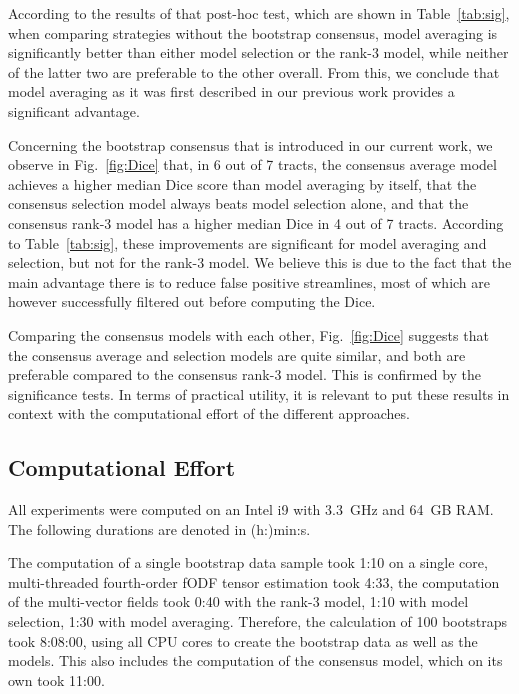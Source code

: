 According to the results of that post-hoc test, which are shown in Table~\ref{tab:sig}, when comparing strategies without the bootstrap consensus,
model averaging is significantly better than either model selection or the rank-3 model, while neither of the latter two are preferable to the other overall. From this, we conclude that model averaging as it was first described in our previous work \cite{Gruen:2021} provides a significant advantage.

Concerning the bootstrap consensus that is introduced in our current work, we observe in Fig.~\ref{fig:Dice} that, in 6 out of 7 tracts, the consensus average model achieves a higher median Dice score than model averaging by itself, that the consensus selection model always beats model selection alone, and that the consensus rank-3 model has a higher median Dice in 4 out of 7
tracts. According to Table~\ref{tab:sig}, these improvements are significant for model averaging and selection, but not for the rank-3 model. We believe this is due to the fact that the main advantage there is to reduce false positive streamlines, most of which are however successfully filtered out before computing the Dice.

Comparing the consensus models with each other, Fig.~\ref{fig:Dice} suggests that the consensus average and selection models are quite similar, and both are
preferable compared to the consensus rank-3 model. This is confirmed by the significance tests. In terms of practical utility, it is relevant to put these results in context with the computational effort of the different approaches.

\subsection{Computational Effort}
\label{sec:computational-effort}
All experiments were computed on an Intel i9 with 3.3~GHz and 64~GB RAM. The
following durations are denoted in (h:)min:s.

The computation of a single bootstrap data sample took 1:10 on a single core,
multi-threaded fourth-order fODF tensor estimation took 4:33, the computation of the multi-vector fields took 0:40 with the rank-3 model, 1:10 with model selection, 1:30 with model averaging. Therefore, the calculation of 100 bootstraps took 8:08:00, using all CPU cores to create the bootstrap data as well as the
models. This also includes the computation of the consensus model, which on its
own took 11:00.

